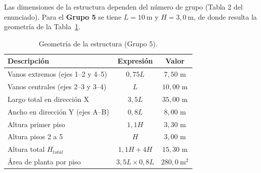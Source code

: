 \documentclass[11pt,letterpaper]{article}
\begin{document}
Las dimensiones de la estructura dependen del número de grupo (Tabla 2 del enunciado). Para el
\textbf{Grupo 5} se tiene $L = 10\ \mathrm{m}$ y $H = 3{,}0\ \mathrm{m}$, de donde resulta la geometría
de la Tabla~\ref{tab:geom}.

\begin{table}[H]
\centering
\caption{Geometría de la estructura (Grupo 5).}
\label{tab:geom}
\begin{tabular}{lcc}
\toprule
Descripción & Expresión & Valor \\
\midrule
Vanos extremos (ejes 1--2 y 4--5) & $0{,}75L$ & $7{,}50$ m \\
Vanos centrales (ejes 2--3 y 3--4) & $L$ & $10{,}00$ m \\
Largo total en dirección X & $3{,}5L$ & $35{,}00$ m \\
Ancho en dirección Y (ejes A--B) & $0{,}8L$ & $8{,}00$ m \\
Altura primer piso & $1{,}1H$ & $3{,}30$ m \\
Altura pisos 2 a 5 & $H$ & $3{,}00$ m \\
Altura total $H_{total}$ & $1{,}1H + 4H$ & $15{,}30$ m \\
Área de planta por piso & $3{,}5L \times 0{,}8L$ & $280{,}0\ \mathrm{m^2}$ \\
\bottomrule
\end{tabular}
\end{table}
\end{document}
